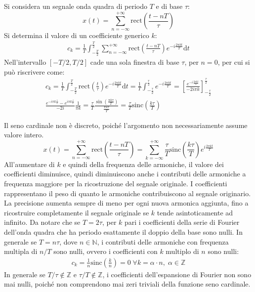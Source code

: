 \documentclass{article}
\newcommand{\rect}{\mathrm{rect}}
\newcommand{\sinc}{\mathrm{sinc}}
\newcommand{\df}{\mathrm{d}}
\numberwithin{equation}{subsection}
\begin{document}
Si considera un segnale onda quadra di periodo $T$ e di base $\tau$: 
\begin{equation*}
    x(t)=\displaystyle\sum_{n=-\infty}^{+\infty}\rect\left(\frac{t-nT}{\tau}\right)
\end{equation*}
Si determina il valore di un coefficiente generico $k$:
\begin{gather*}
    c_k=\displaystyle\frac{1}{T}\int_{-\frac{T}{2}}^{\frac{T}{2}}\sum_{n=-\infty}^{+\infty}\rect\left(\frac{t-nT}{\tau}\right)e^{-i\frac{2\pi k t}{T}}\df t
\end{gather*}
Nell'intervallo $[-T/2,T/2]$ cade una sola finestra di base $\tau$, per $n=0$, per cui si può riscrivere come:
\begin{gather*}
    c_k=\displaystyle\frac{1}{T}\int_{-\frac{T}{2}}^{\frac{T}{2}}\rect\left(\frac{t}{\tau}\right)e^{-i\frac{2\pi k t}{T}}\df t=\frac{1}{T}\int_{-\frac{\tau}{2}}^{\frac{\tau}{2}}e^{-i\frac{2\pi k t}{T}}=
    \left[\frac{e^{-i\frac{2\pi kt}{T}}}{-2i\pi k}\right]_{-\frac{\tau}{2}}^{\frac{\tau}{2}}\\
    \displaystyle\frac{e^{-i\pi k\frac{\tau}{T}}-e^{i\pi k\frac{\tau}{T}}}{-2i}\frac{1}{\pi k}=\frac{\tau}{T}\frac{\sin\left(\frac{\pi k \tau}{T}\right)}{\frac{\pi k \tau}{T}}=\frac{\tau}{T}\sinc\left(\frac{k \tau}{T}\right)
\end{gather*}

Il seno cardinale non è discreto, poiché l'argomento non necessariamente assume valore intero. 
\begin{equation*}
    x(t)=\displaystyle\sum_{n=-\infty}^{+\infty}\rect\left(\frac{t-nT}{\tau}\right)=\sum_{k=-\infty}^{+\infty}\frac{\tau}{T}\sinc\left(\frac{k \tau}{T}\right)e^{i\frac{2\pi kt}{T}}
\end{equation*}
All'aumentare di $k$ e quindi della frequenza delle armoniche, il valore dei coefficienti diminuisce, quindi diminuiscono anche i contributi delle armoniche a frequenza 
maggiore per la ricostruzione del segnale originale. I coefficienti rappresentano il peso di quanto le armoniche contribuiscono al segnale originario. La precisione 
aumenta sempre di meno per ogni nuova armonica aggiunta, fino a ricostruire completamente il segnale originale se $k$ tende asintoticamente ad infinito. Da notare che se 
$T=2\tau$, per $k$ pari i coefficienti della serie di Fourier dell'onda quadra che ha periodo esattamente il doppio della base sono nulli. In generale se $T=n\tau$, dove 
$n\in\mathbb{N}$, i contributi delle armoniche con frequenza multipla di $n/T$ sono nulli, ovvero i coefficienti con $k$ multiplo di $n$ sono nulli:
\begin{gather*}
    c_k=\frac{1}{n}\sinc\left(\frac{k}{n}\right)=0\;\forall k=\alpha\cdot n,\;\alpha\in\mathbb{Z}
\end{gather*}
In generale se $T/\tau\notin\mathbb{Z}$ e $\tau/T\notin\mathbb{Z}$, i coefficienti dell'espansione di Fourier non sono mai nulli, poiché non comprendono mai zeri triviali 
della funzione seno cardinale. 
\end{document}
